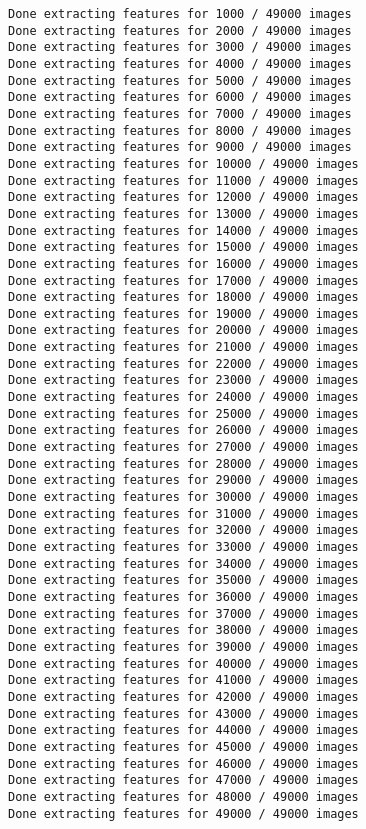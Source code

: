 \documentclass{ctexart}
\begin{document}
    \begin{Verbatim}[commandchars=\\\{\}]
Done extracting features for 1000 / 49000 images
Done extracting features for 2000 / 49000 images
Done extracting features for 3000 / 49000 images
Done extracting features for 4000 / 49000 images
Done extracting features for 5000 / 49000 images
Done extracting features for 6000 / 49000 images
Done extracting features for 7000 / 49000 images
Done extracting features for 8000 / 49000 images
Done extracting features for 9000 / 49000 images
Done extracting features for 10000 / 49000 images
Done extracting features for 11000 / 49000 images
Done extracting features for 12000 / 49000 images
Done extracting features for 13000 / 49000 images
Done extracting features for 14000 / 49000 images
Done extracting features for 15000 / 49000 images
Done extracting features for 16000 / 49000 images
Done extracting features for 17000 / 49000 images
Done extracting features for 18000 / 49000 images
Done extracting features for 19000 / 49000 images
Done extracting features for 20000 / 49000 images
Done extracting features for 21000 / 49000 images
Done extracting features for 22000 / 49000 images
Done extracting features for 23000 / 49000 images
Done extracting features for 24000 / 49000 images
Done extracting features for 25000 / 49000 images
Done extracting features for 26000 / 49000 images
Done extracting features for 27000 / 49000 images
Done extracting features for 28000 / 49000 images
Done extracting features for 29000 / 49000 images
Done extracting features for 30000 / 49000 images
Done extracting features for 31000 / 49000 images
Done extracting features for 32000 / 49000 images
Done extracting features for 33000 / 49000 images
Done extracting features for 34000 / 49000 images
Done extracting features for 35000 / 49000 images
Done extracting features for 36000 / 49000 images
Done extracting features for 37000 / 49000 images
Done extracting features for 38000 / 49000 images
Done extracting features for 39000 / 49000 images
Done extracting features for 40000 / 49000 images
Done extracting features for 41000 / 49000 images
Done extracting features for 42000 / 49000 images
Done extracting features for 43000 / 49000 images
Done extracting features for 44000 / 49000 images
Done extracting features for 45000 / 49000 images
Done extracting features for 46000 / 49000 images
Done extracting features for 47000 / 49000 images
Done extracting features for 48000 / 49000 images
Done extracting features for 49000 / 49000 images

    \end{Verbatim}
\end{document}
